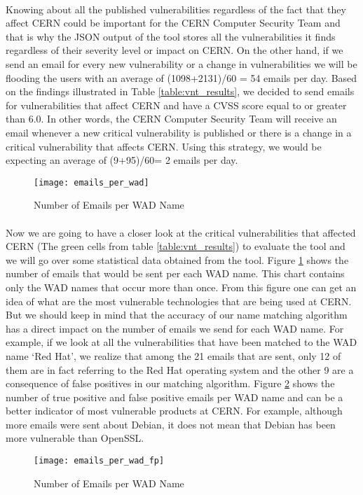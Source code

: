 \paragraph{}
Knowing about all the published vulnerabilities regardless of the fact that they affect CERN could be important for the CERN Computer Security Team and that is why the JSON output of the tool stores all the vulnerabilities it finds regardless of their severity level or impact on CERN. On the other hand, if we send an email for every new vulnerability or a change in vulnerabilities we will be flooding the users with an average of (1098+2131)/60 = 54 emails per day. Based on the findings illustrated in Table \ref{table:vnt_results}, we decided to send emails for vulnerabilities that affect CERN and have a CVSS score equal to or greater than 6.0. In other words, the CERN Computer Security Team will receive an email whenever a new critical vulnerability is published or there is a change in a critical vulnerability that affects CERN. Using this strategy, we would be expecting an average of (9+95)/60= 2 emails per day. 
\begin{figure}[h!]

  \centering
    \texttt{[image: emails\_per\_wad]}
  \caption{Number of Emails per WAD Name}
  \label{figure:emails_per_wad}
\end{figure}

\paragraph{}
Now we are going to have a closer look at the critical vulnerabilities that affected CERN (The green cells from table \ref{table:vnt_results}) to evaluate the tool and we will go over some statistical data obtained from the tool.
Figure \ref{figure:emails_per_wad} shows the number of emails that would be sent per each WAD name. This chart contains only the WAD names that occur more than once. From this figure one can get an idea of what are the most vulnerable technologies that are being used at CERN. But we should keep in mind that the accuracy of our name matching algorithm has a direct impact on the number of emails we send for each WAD name. For example, if we look at all the vulnerabilities that have been matched to the WAD name `Red Hat', we realize that among the 21 emails that are sent, only 12 of them are in fact referring to the Red Hat operating system and the  other 9 are a consequence of false positives in our matching algorithm. Figure \ref{figure:emails_per_wad_fp} shows the number of true positive and false positive emails per WAD name and can be a better indicator of most vulnerable products at CERN. For example, although more emails were sent about Debian, it does not mean that Debian has been more vulnerable than OpenSSL.
\\
\begin{figure}[h!]
  \centering
    \texttt{[image: emails\_per\_wad\_fp]}
  \caption{Number of Emails per WAD Name}
  \label{figure:emails_per_wad_fp}

\end{figure}



